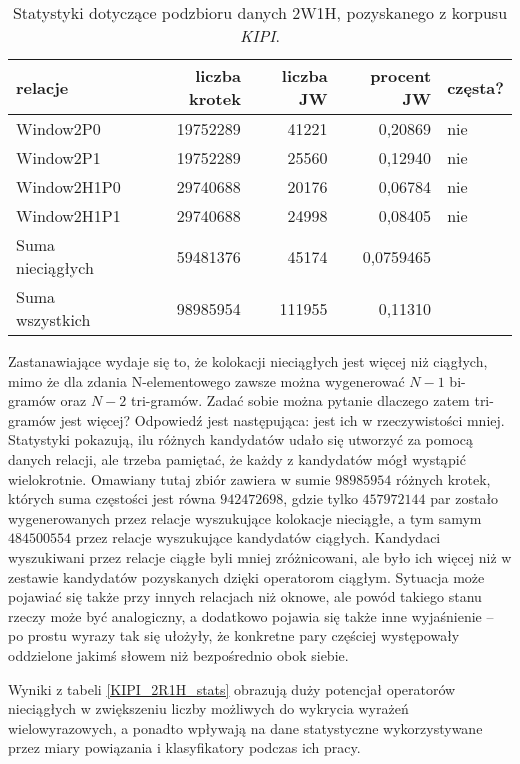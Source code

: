 \begin{table}[h!]
\centering
\begin{tabular}{ l | r | r | r | l }
	\toprule
	\textbf{relacje} 	& \textbf{liczba krotek} & \textbf{liczba JW} & \textbf{procent JW} & \textbf{częsta?} 	\\
	\midrule
	Window2P0	&	19752289	&	41221	&	0,20869	&	nie	\\
	Window2P1	&	19752289	&	25560	&	0,12940	&	nie	\\
	Window2H1P0	&	29740688	&	20176	&	0,06784	&	nie	\\
	Window2H1P1	&	29740688	&	24998	&	0,08405	&	nie	\\
	\midrule									
	Suma nieciągłych&	59481376	&	45174	&	0,0759465	&	\\
	Suma wszystkich	&	98985954	&	111955	&	0,11310	&		\\
	\bottomrule
\end{tabular}
\caption[Statystyki podzbioru danych \emph{KIPI} 2W1H]{Statystyki dotyczące podzbioru danych 2W1H, pozyskanego z korpusu \emph{KIPI}.}
\label{KIPI_2W1H_stats}
\end{table}

\par
Zastanawiające wydaje się to, że kolokacji nieciągłych jest więcej niż ciągłych, mimo że dla zdania N-elementowego zawsze można wygenerować $ N - 1 $ bi-gramów oraz $ N - 2 $ tri-gramów.
Zadać sobie można pytanie dlaczego zatem tri-gramów jest więcej?
Odpowiedź jest następująca: jest ich w rzeczywistości mniej.
Statystyki pokazują, ilu różnych kandydatów udało się utworzyć za pomocą danych relacji, ale trzeba pamiętać, że każdy z kandydatów mógł wystąpić wielokrotnie.
Omawiany tutaj zbiór zawiera w sumie $ 98 985 954 $ różnych krotek, których suma częstości jest równa $ 942 472 698 $, gdzie tylko $ 457 972 144 $ par zostało wygenerowanych przez relacje wyszukujące kolokacje nieciągłe, a tym samym $ 484 500 554 $ przez relacje wyszukujące kandydatów ciągłych.
Kandydaci wyszukiwani przez relacje ciągłe byli mniej zróżnicowani, ale było ich więcej niż w zestawie kandydatów pozyskanych dzięki operatorom ciągłym.
Sytuacja może pojawiać się także przy innych relacjach niż oknowe, ale powód takiego stanu rzeczy może być analogiczny, a dodatkowo pojawia się także inne wyjaśnienie -- po prostu wyrazy tak się ułożyły, że konkretne pary częściej występowały oddzielone jakimś słowem niż bezpośrednio obok siebie.

\par
Wyniki z tabeli \ref{KIPI_2R1H_stats} obrazują duży potencjał operatorów nieciągłych w zwiększeniu liczby możliwych do wykrycia wyrażeń wielowyrazowych, a ponadto wpływają na dane statystyczne wykorzystywane przez miary powiązania i klasyfikatory podczas ich pracy.


